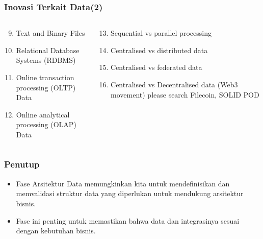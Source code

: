 \documentclass[aspectratio=169, table]{beamer}
\begin{document}
		\begin{frame}
		\frametitle{Inovasi Terkait Data(2)}
		\begin{columns}
			\begin{column}{0.5\textwidth}
				\begin{center}
					\begin{enumerate}
						\setcounter{enumi}{8}
						\item Text and Binary Files
						\item Relational Database Systems (RDBMS)
						\item Online transaction processing (OLTP) Data
						\item Online analytical processing (OLAP) Data
					\end{enumerate}
				\end{center}
			\end{column}
			\begin{column}{0.5\textwidth}
				\begin{center}
					\begin{enumerate}
						\setcounter{enumi}{12}
						\item Sequential vs parallel processing
						\item Centralised vs distributed data
						\item Centralised vs federated data
						\item Centralised vs Decentralised data (Web3 movement) please search Filecoin, SOLID POD
					\end{enumerate}
				\end{center}
			\end{column}
		\end{columns}
	\end{frame}
	
	
	
	\begin{frame}
		\frametitle{Penutup}
		\begin{itemize}
			\item Fase Arsitektur Data memungkinkan kita untuk mendefinisikan dan memvalidasi struktur data yang diperlukan untuk mendukung arsitektur bisnis. 
			\item Fase ini penting untuk memastikan bahwa data dan integrasinya sesuai dengan kebutuhan bisnis.
		\end{itemize}
	\end{frame}
	
	
	
\end{document}
